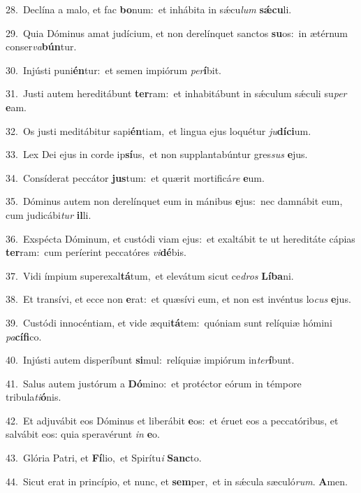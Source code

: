 {\numbfont\textcolor{\numbcolor}{28.}}~Declína a malo, et fac \textbf{bo}\-num:~\star et inhábita in sǽcu\textit{lum} \textbf{sǽ}\-\textbf{cu}li.\par
{\numbfont\textcolor{\numbcolor}{29.}}~Quia Dóminus amat judícium, et non derelínquet sanctos \textbf{su}\-os:~\star in ætérnum conser\-\textit{va}\-\textbf{bún}tur.\par
{\numbfont\textcolor{\numbcolor}{30.}}~Injústi puni\-\textbf{én}\-tur:~\star et semen impiórum \textit{per}\-\textbf{í}bit.\par
{\numbfont\textcolor{\numbcolor}{31.}}~Justi autem hereditábunt \textbf{ter}\-ram:~\star et inhabitábunt in sǽculum sǽculi su\textit{per} \textbf{e}\-am.\par
{\numbfont\textcolor{\numbcolor}{32.}}~Os justi meditábitur sapi\-\textbf{én}\-tiam,~\star et lingua ejus loquétur \textit{ju}\-\textbf{dí}\textbf{ci}um.\par
{\numbfont\textcolor{\numbcolor}{33.}}~Lex Dei ejus in corde ip\-\textbf{sí}\-us,~\star et non supplantabúntur gres\textit{sus} \textbf{e}\-jus.\par
{\numbfont\textcolor{\numbcolor}{34.}}~Consíderat peccátor \textbf{jus}\-tum:~\star et quærit mortificá\textit{re} \textbf{e}\-um.\par
{\numbfont\textcolor{\numbcolor}{35.}}~Dóminus autem non derelínquet eum in mánibus \textbf{e}\-jus:~\star nec damnábit eum, cum judicábi\textit{tur} \textbf{il}\-li.\par
{\numbfont\textcolor{\numbcolor}{36.}}~Exspécta Dóminum, et custódi viam ejus:~\dagger et exaltábit te ut hereditáte cápias \textbf{ter}\-ram:~\star cum períerint peccatóres \textit{vi}\-\textbf{dé}bis.\par
{\numbfont\textcolor{\numbcolor}{37.}}~Vidi ímpium superexal\-\textbf{tá}\-tum,~\star et elevátum sicut ce\textit{dros} \textbf{Lí}\-\textbf{ba}ni.\par
{\numbfont\textcolor{\numbcolor}{38.}}~Et transívi, et ecce non \textbf{e}\-rat:~\star et quæsívi eum, et non est invéntus lo\textit{cus} \textbf{e}\-jus.\par
{\numbfont\textcolor{\numbcolor}{39.}}~Custódi innocéntiam, et vide æqui\-\textbf{tá}\-tem:~\star quóniam sunt relíquiæ hómini \textit{pa}\-\textbf{cí}\textbf{fi}co.\par
{\numbfont\textcolor{\numbcolor}{40.}}~Injústi autem disperíbunt \textbf{si}\-mul:~\star relíquiæ impiórum in\-\textit{ter}\-\textbf{í}bunt.\par
{\numbfont\textcolor{\numbcolor}{41.}}~Salus autem justórum a \textbf{Dó}\-mino:~\star et protéctor eórum in témpore tribula\-\textit{ti}\-\textbf{ó}nis.\par
{\numbfont\textcolor{\numbcolor}{42.}}~Et adjuvábit eos Dóminus et liberábit \textbf{e}\-os:~\star et éruet eos a peccatóribus, et salvábit eos: quia speravérunt \textit{in} \textbf{e}\-o.\par
{\numbfont\textcolor{\numbcolor}{43.}}~Glória Patri, et \textbf{Fí}\-lio,~\star et Spirítu\textit{i} \textbf{Sanc}\-to.\par
{\numbfont\textcolor{\numbcolor}{44.}}~Sicut erat in princípio, et nunc, et \textbf{sem}\-per,~\star et in sǽcula sæculó\-\textit{rum}\-. \textbf{A}\-men.\par
